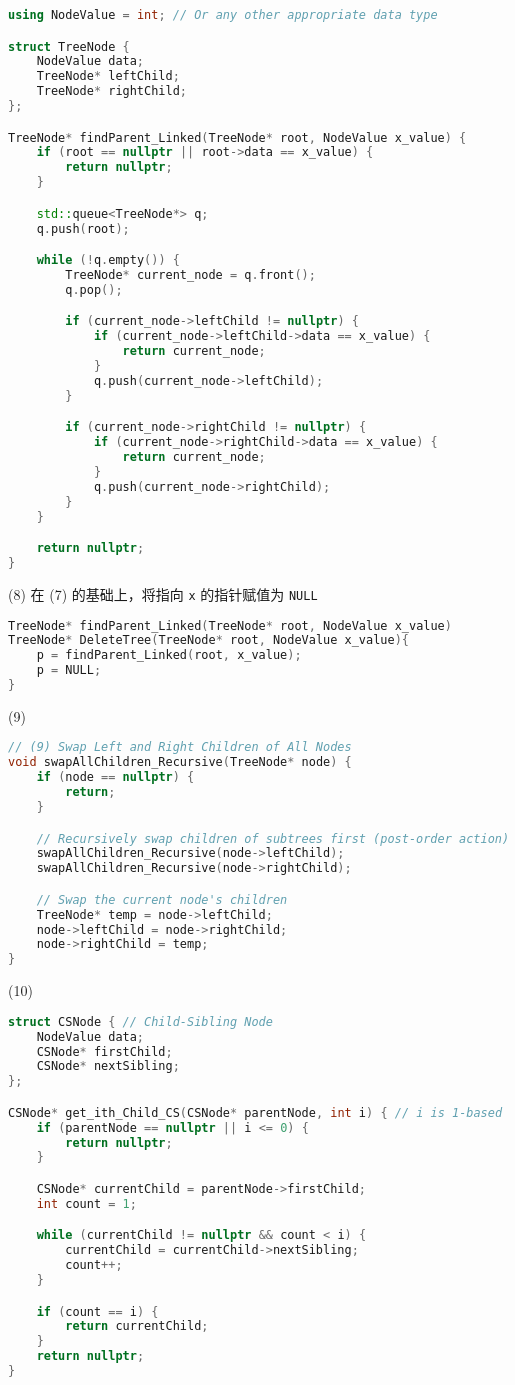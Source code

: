 \begin{lstlisting}[language=C++]
using NodeValue = int; // Or any other appropriate data type

struct TreeNode {
    NodeValue data;
    TreeNode* leftChild;
    TreeNode* rightChild;
};

TreeNode* findParent_Linked(TreeNode* root, NodeValue x_value) {
    if (root == nullptr || root->data == x_value) {
        return nullptr;
    }

    std::queue<TreeNode*> q;
    q.push(root);

    while (!q.empty()) {
        TreeNode* current_node = q.front();
        q.pop();

        if (current_node->leftChild != nullptr) {
            if (current_node->leftChild->data == x_value) {
                return current_node;
            }
            q.push(current_node->leftChild);
        }

        if (current_node->rightChild != nullptr) {
            if (current_node->rightChild->data == x_value) {
                return current_node;
            }
            q.push(current_node->rightChild);
        }
    }

    return nullptr;
}
\end{lstlisting}
(8)
在 (7) 的基础上，将指向 \lstinline{x} 的指针赋值为 \lstinline{NULL}

\begin{lstlisting}[language=C++]
TreeNode* findParent_Linked(TreeNode* root, NodeValue x_value)
TreeNode* DeleteTree(TreeNode* root, NodeValue x_value){
    p = findParent_Linked(root, x_value);
    p = NULL;
}
\end{lstlisting}
(9)

\begin{lstlisting}[language=C++]
// (9) Swap Left and Right Children of All Nodes
void swapAllChildren_Recursive(TreeNode* node) {
    if (node == nullptr) {
        return;
    }

    // Recursively swap children of subtrees first (post-order action)
    swapAllChildren_Recursive(node->leftChild);
    swapAllChildren_Recursive(node->rightChild);

    // Swap the current node's children
    TreeNode* temp = node->leftChild;
    node->leftChild = node->rightChild;
    node->rightChild = temp;
}
\end{lstlisting}
(10)

\begin{lstlisting}[language=C++]
struct CSNode { // Child-Sibling Node
    NodeValue data;
    CSNode* firstChild;
    CSNode* nextSibling;
};

CSNode* get_ith_Child_CS(CSNode* parentNode, int i) { // i is 1-based
    if (parentNode == nullptr || i <= 0) {
        return nullptr;
    }

    CSNode* currentChild = parentNode->firstChild;
    int count = 1;

    while (currentChild != nullptr && count < i) {
        currentChild = currentChild->nextSibling;
        count++;
    }

    if (count == i) {
        return currentChild;
    }
    return nullptr;
}
\end{lstlisting}